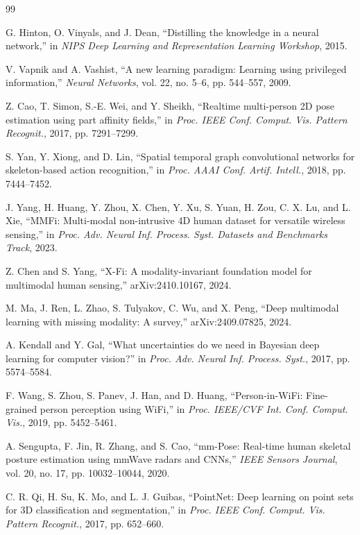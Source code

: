 ﻿\documentclass[journal]{IEEEtran}
\begin{document}
\balance

\begin{thebibliography}{99}

G. Hinton, O. Vinyals, and J. Dean, ``Distilling the knowledge in a neural network,'' in \emph{NIPS Deep Learning and Representation Learning Workshop}, 2015.

V. Vapnik and A. Vashist, ``A new learning paradigm: Learning using privileged information,'' \emph{Neural Networks}, vol. 22, no. 5--6, pp. 544--557, 2009.

Z. Cao, T. Simon, S.-E. Wei, and Y. Sheikh, ``Realtime multi-person 2D pose estimation using part affinity fields,'' in \emph{Proc. IEEE Conf. Comput. Vis. Pattern Recognit.}, 2017, pp. 7291--7299.

S. Yan, Y. Xiong, and D. Lin, ``Spatial temporal graph convolutional networks for skeleton-based action recognition,'' in \emph{Proc. AAAI Conf. Artif. Intell.}, 2018, pp. 7444--7452.

J. Yang, H. Huang, Y. Zhou, X. Chen, Y. Xu, S. Yuan, H. Zou, C. X. Lu, and L. Xie, ``MMFi: Multi-modal non-intrusive 4D human dataset for versatile wireless sensing,'' in \emph{Proc. Adv. Neural Inf. Process. Syst. Datasets and Benchmarks Track}, 2023.

Z. Chen and S. Yang, ``X-Fi: A modality-invariant foundation model for multimodal human sensing,'' arXiv:2410.10167, 2024.

M. Ma, J. Ren, L. Zhao, S. Tulyakov, C. Wu, and X. Peng, ``Deep multimodal learning with missing modality: A survey,'' arXiv:2409.07825, 2024.

A. Kendall and Y. Gal, ``What uncertainties do we need in Bayesian deep learning for computer vision?'' in \emph{Proc. Adv. Neural Inf. Process. Syst.}, 2017, pp. 5574--5584.

F. Wang, S. Zhou, S. Panev, J. Han, and D. Huang, ``Person-in-WiFi: Fine-grained person perception using WiFi,'' in \emph{Proc. IEEE/CVF Int. Conf. Comput. Vis.}, 2019, pp. 5452--5461.

A. Sengupta, F. Jin, R. Zhang, and S. Cao, ``mm-Pose: Real-time human skeletal posture estimation using mmWave radars and CNNs,'' \emph{IEEE Sensors Journal}, vol. 20, no. 17, pp. 10032--10044, 2020.

C. R. Qi, H. Su, K. Mo, and L. J. Guibas, ``PointNet: Deep learning on point sets for 3D classification and segmentation,'' in \emph{Proc. IEEE Conf. Comput. Vis. Pattern Recognit.}, 2017, pp. 652--660.


\end{thebibliography}
\end{document}
